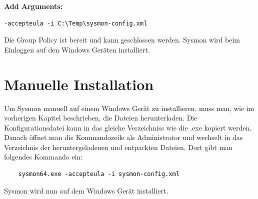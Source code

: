 \textbf{Add Arguments:}
\begin{lstlisting}
-accepteula -i C:\Temp\sysmon-config.xml
\end{lstlisting}

Die Group Policy ist bereit und kann geschlossen werden.
Sysmon wird beim Einloggen auf den Windows Geräten installiert.

\section{Manuelle Installation}
Um Sysmon manuell auf einem Windows Gerät zu installieren, muss man, wie im vorherigen Kapitel beschrieben, die Dateien herunterladen.
Die Konfigurationsdatei kann in das gleiche Verzeichniss wie die .exe kopiert werden.
Danach öffnet man die Kommandozeile als Administrator und wechselt in das Verzeichnis der heruntergeladenen und entpackten Dateien.
Dort gibt man folgendes Kommando ein:
\begin{lstlisting}
    sysmon64.exe -accepteula -i sysmon-config.xml
\end{lstlisting}

Sysmon wird nun auf dem Windows Gerät installiert.